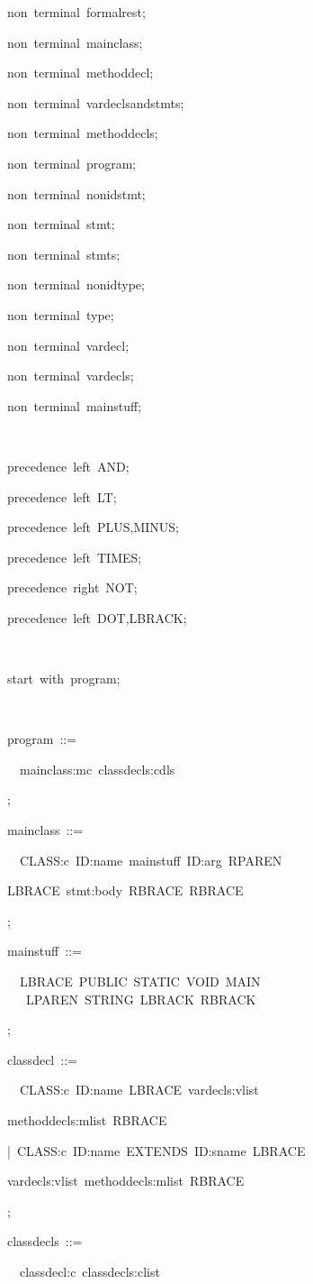 \documentclass[12pt,english,twoside]{report}
\newenvironment{codeblock}
{\begin{list}{}{
\setlength{\rightmargin}{\leftmargin}
\setlength{\listparindent}{0pt}%
\raggedright
\setlength{\itemsep}{0pt}
\setlength{\parsep}{0pt}
\normalfont\ttfamily}%
 \item[]}
{\end{list}}
\begin{document}
\begin{codeblock}
\begin{codeblock}
non~terminal~formalrest;

non~terminal~mainclass;

non~terminal~methoddecl;

non~terminal~vardeclsandstmts;

non~terminal~methoddecls;

non~terminal~program;

non~terminal~nonidstmt;

non~terminal~stmt;

non~terminal~stmts;

non~terminal~nonidtype;

non~terminal~type;

non~terminal~vardecl;

non~terminal~vardecls;

non~terminal~mainstuff;

~

precedence~left~AND;

precedence~left~LT;

precedence~left~PLUS,MINUS;

precedence~left~TIMES;

precedence~right~NOT;

precedence~left~DOT,LBRACK;

~

start~with~program;

~

program~::=~
\begin{codeblock}
~~mainclass:mc~classdecls:cdls~

;
\end{codeblock}
mainclass~::=~
\begin{codeblock}
~~CLASS:c~ID:name~mainstuff~ID:arg~RPAREN
\begin{codeblock}
LBRACE~stmt:body~RBRACE~RBRACE
\end{codeblock}
;
\end{codeblock}
mainstuff~::=
\begin{codeblock}
~~LBRACE~PUBLIC~STATIC~VOID~MAIN~\\
~~~LPAREN~STRING~LBRACK~RBRACK~

;
\end{codeblock}
classdecl~::=
\begin{codeblock}
~~CLASS:c~ID:name~LBRACE~vardecls:vlist
\begin{codeblock}
methoddecls:mlist~RBRACE
\end{codeblock}
|~CLASS:c~ID:name~EXTENDS~ID:sname~LBRACE
\begin{codeblock}
vardecls:vlist~methoddecls:mlist~RBRACE
\end{codeblock}
;
\end{codeblock}
classdecls~::=
\begin{codeblock}
~~classdecl:c~classdecls:clist


\end{codeblock}
\end{codeblock}
\end{codeblock}
\end{document}
